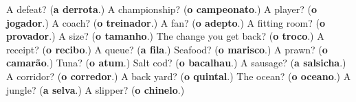 \begin{tcolorbox}[breakable,colback=teal!4,colframe=teal!35!black,title={Before you move on}]
A defeat? (\textbf{a derrota}.) A championship? (\textbf{o campeonato}.) A player? (\textbf{o jogador}.) A coach? (\textbf{o treinador}.) A fan? (\textbf{o adepto}.) A fitting room? (\textbf{o provador}.) A size? (\textbf{o tamanho}.) The change you get back? (\textbf{o troco}.) A receipt? (\textbf{o recibo}.) A queue? (\textbf{a fila}.) Seafood? (\textbf{o marisco}.) A prawn? (\textbf{o camarão}.) Tuna? (\textbf{o atum}.) Salt cod? (\textbf{o bacalhau}.) A sausage? (\textbf{a salsicha}.) A corridor? (\textbf{o corredor}.) A back yard? (\textbf{o quintal}.) The ocean? (\textbf{o oceano}.) A jungle? (\textbf{a selva}.) A slipper? (\textbf{o chinelo}.)
\end{tcolorbox}
